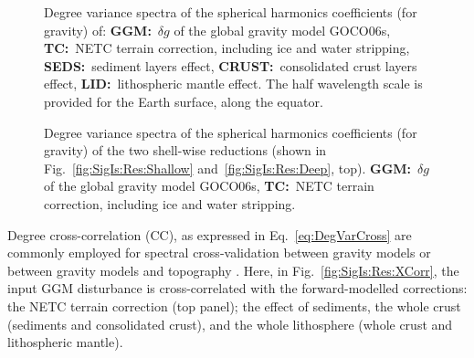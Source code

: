 \begin{figure}
    \begin{adjustbox}{center}
    \end{adjustbox}
    \caption[Degree variance spectra of the SH coefficients for the GGM and the forward modelled corrections.]{
        Degree variance spectra of the spherical harmonics coefficients (for gravity) of:
        \textbf{{GGM}:}~$\delta g$ of the global gravity model {GOCO06s},
        \textbf{{TC}:}~NETC terrain correction, including ice and water stripping,
        \textbf{{SEDS}:}~sediment layers effect,
        \textbf{{CRUST}:}~consolidated crust layers effect,
        \textbf{{LID}:}~lithospheric mantle effect.
        The half wavelength scale is provided for the Earth surface, along the equator.}
    \label{fig:SigIs:Spec:DegVarAll}
\end{figure}

\begin{figure}
    \begin{adjustbox}{center}
    \end{adjustbox}
    \caption[Degree variance spectra of the SH coefficients for the two shell-wise reductions.]{
        Degree variance spectra of the spherical harmonics coefficients (for gravity) of the two shell-wise reductions (shown in Fig.~\ref{fig:SigIs:Res:Shallow} and~\ref{fig:SigIs:Res:Deep}, top).
        \textbf{{GGM}:}~$\delta g$ of the global gravity model {GOCO06s},
        \textbf{{TC}:}~NETC terrain correction, including ice and water stripping.
        }
    \label{fig:SigIs:Spec:DegVarSD}
\end{figure}

Degree cross-correlation (CC), as expressed in Eq.~\ref{eq:DegVarCross} are commonly employed for spectral cross-validation between gravity models \parencite[e.g.]{Rexer2016} or between gravity models and topography \parencites{Wieczorek2007}{Hirt2012TopoIso}.
Here, in Fig.~\ref{fig:SigIs:Res:XCorr}, the input GGM disturbance is cross-correlated with the forward-modelled corrections: the NETC terrain correction (top panel); the effect of sediments, the whole crust (sediments and consolidated crust), and the whole lithosphere (whole crust and lithospheric mantle).

